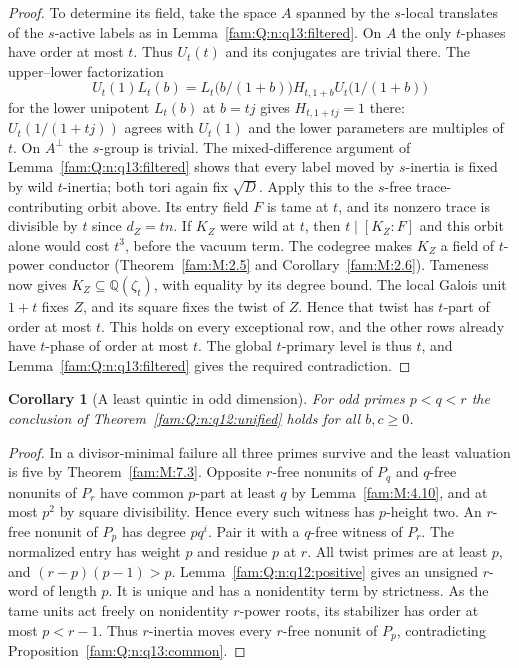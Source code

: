 \documentclass[11pt,a4paper]{article}
\numberwithin{equation}{section}
\newtheorem{corollary}[theorem]{Corollary}
\theoremstyle{remark}
\newcommand{\QQ}{\mathbb Q}
\begin{document}
\begin{proof}
To determine its field, take the space $A$ spanned by the $s$-local
translates of the $s$-active labels as in Lemma~\ref{fam:Q:n:q13:filtered}.
On $A$ the only $t$-phases have order at most $t$. Thus $U_t(t)$
and its conjugates are trivial there. The upper--lower
factorization
\[
 U_t(1)L_t(b)=L_t\bigl(b/(1+b)\bigr)H_{t,1+b}U_t\bigl(1/(1+b)\bigr)
\]
for the lower unipotent $L_t(b)$ at $b=tj$ gives $H_{t,1+tj}=1$ there:
$U_t(1/(1+tj))$ agrees with $U_t(1)$ and the lower parameters
are multiples of $t$. On $A^\perp$ the $s$-group is trivial.
The mixed-difference argument of Lemma~\ref{fam:Q:n:q13:filtered}
shows that every label moved by $s$-inertia is fixed by wild
$t$-inertia; both tori again fix $\sqrt D$. Apply this to
the $s$-free trace-contributing orbit above. Its entry field $F$
is tame at $t$, and its nonzero trace is divisible by $t$ since
$d_Z=tn$. If $K_Z$ were wild at $t$, then $t\mid[K_Z:F]$ and
this orbit alone would cost $t^3$, before the vacuum term.
The codegree makes $K_Z$ a field of $t$-power conductor
(Theorem~\ref{fam:M:2.5} and Corollary~\ref{fam:M:2.6}). Tameness now gives
$K_Z\subseteq\QQ(\zeta_t)$,
with equality by its degree bound. The local Galois unit $1+t$
fixes $Z$, and its square fixes the twist of $Z$. Hence that
twist has $t$-part of order at most $t$. This holds on every
exceptional row, and the other rows already have $t$-phase of
order at most $t$. The global $t$-primary level is thus $t$,
and Lemma~\ref{fam:Q:n:q13:filtered} gives the required contradiction.
\end{proof}

\begin{corollary}[A least quintic in odd dimension]\label{fam:Q:5.4}\label{fam:Q:n:q12:quintic}
For odd primes $p<q<r$ the conclusion of Theorem~\ref{fam:Q:n:q12:unified}
holds for all $b,c\ge0$.
\end{corollary}
\begin{proof}
In a divisor-minimal failure all three primes survive and the
least valuation is five by Theorem~\ref{fam:M:7.3}.
Opposite $r$-free nonunits of $P_q$ and $q$-free nonunits of
$P_r$ have common $p$-part at least $q$ by
Lemma~\ref{fam:M:4.10}, and at most $p^2$ by square
divisibility. Hence every such witness has $p$-height two.
An $r$-free nonunit of $P_p$ has degree $pq^i$. Pair it with
a $q$-free witness of $P_r$. The normalized entry has weight
$p$ and residue $p$ at $r$. All twist primes are at least $p$,
and $(r-p)(p-1)>p$. Lemma~\ref{fam:Q:n:q12:positive} gives an unsigned
$r$-word of length $p$. It is unique and has a nonidentity term
by strictness. As the tame units act freely on nonidentity
$r$-power roots, its stabilizer has order at most $p<r-1$.
Thus $r$-inertia moves every $r$-free nonunit of $P_p$,
contradicting Proposition~\ref{fam:Q:n:q13:common}.
\end{proof}
\end{document}
